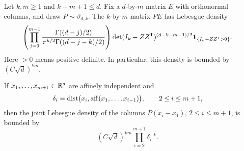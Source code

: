 \begin{lemma}\label{p:frame-density}
Let \(k,m\ge1\) and \(k+m+1\le d\). Fix a \(d\)-by-\(m\) matrix \(E\)
with orthonormal columns, and draw \(P\sim\vartheta_{d,k}\). The
\(k\)-by-\(m\) matrix \(PE\) has Lebesgue density
\begin{equation}\label{p:frame-density-exact}
 \left(\prod_{j=0}^{m-1}
 \frac{\Gamma((d-j)/2)}
 {\pi^{k/2}\Gamma((d-j-k)/2)}\right)
 \det(I_k-ZZ^{\mathsf T})^{(d-k-m-1)/2}
 \mathbf 1_{\{I_k-ZZ^{\mathsf T}>0\}}.
\end{equation}
Here \(>0\) means positive definite. In particular, this density is
bounded by \((C\sqrt d)^{km}\).

If \(x_1,\ldots,x_{m+1}\in\mathbb R^d\) are affinely independent and
\[
 \delta_i=\operatorname{dist}\bigl(x_i,\operatorname{aff}(x_1,\ldots,x_{i-1})\bigr),
 \qquad 2\le i\le m+1,
\]
then the joint Lebesgue density of the columns
\(P(x_i-x_1)\), \(2\le i\le m+1\), is bounded by
\begin{equation}\label{p:frame-difference-density}
 (C\sqrt d)^{km}\prod_{i=2}^{m+1}\delta_i^{-k}.
\end{equation}
\end{lemma}


